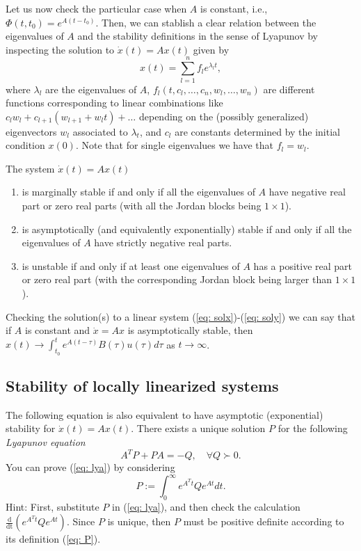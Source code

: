 \documentclass[11pt,a4paper,titlepage]{article}
\begin{document}
Let us now check the particular case when $A$ is constant, i.e., $\Phi(t,t_0) = e^{A(t-t_0)}$. Then, we can stablish a clear relation between the eigenvalues of $A$ and the stability definitions in the sense of Lyapunov by inspecting the solution to $\dot x(t) = Ax(t)$ given by
\begin{equation}
	x(t) = \sum_{l=1}^n f_le^{\lambda_l t},
\label{eq: solptcom}
\end{equation}
where $\lambda_l$ are the eigenvalues of $A$, $f_l(t,c_l,\dots,c_n,w_l,\dots,w_n)$ are different functions corresponding to linear combinations like $c_lw_l + c_{l+1}(w_{l+1}+w_lt)+\dots$ depending on the (possibly generalized) eigenvectors $w_l$ associated to $\lambda_t$, and $c_l$ are constants determined by the initial condition $x(0)$. Note that for single eigenvalues we have that $f_l = w_l$.

The system $\dot x(t) = Ax(t)$
\begin{enumerate}
	\item is marginally stable if and only if all the eigenvalues of $A$ have negative real part or zero real parts (with all the Jordan blocks being $1\times 1$).
	\item is asymptotically (and equivalently exponentially) stable if and only if all the eigenvalues of $A$ have strictly negative real parts.
	\item is unstable if and only if at least one eigenvalues of $A$ has a positive real part or zero real part (with the corresponding Jordan block being larger than $1\times 1$).
\end{enumerate}

Checking the solution(s) to a linear system (\ref{eq: solx})-(\ref{eq: soly}) we can say that if $A$ is constant and $\dot x = Ax$ is asymptotically stable, then $x(t) \to \int_{t_0}^t e^{A(t-\tau)}B(\tau)u(\tau)d\tau$ as $t\to\infty$. 

\subsection{Stability of locally linearized systems}
The following equation is also equivalent to have asymptotic (exponential) stability for $\dot x(t) = Ax(t)$. There exists a unique solution $P$ for the following \emph{Lyapunov equation}
\begin{equation}
A^TP + PA = -Q, \quad \forall Q \succ 0.
	\label{eq: lya}
\end{equation}
You can prove (\ref{eq: lya}) by considering
\begin{equation}
	P:= \int_0^\infty e^{A^Tt}Qe^{At}dt.
	\label{eq: P}
\end{equation}
Hint: First, substitute $P$ in (\ref{eq: lya}), and then check the calculation $\frac{\mathrm{d}}{\mathrm{dt}}\left(e^{A^Tt}Qe^{At}\right)$. Since $P$ is unique, then $P$ must be positive definite according to its definition (\ref{eq: P}).
\end{document}
